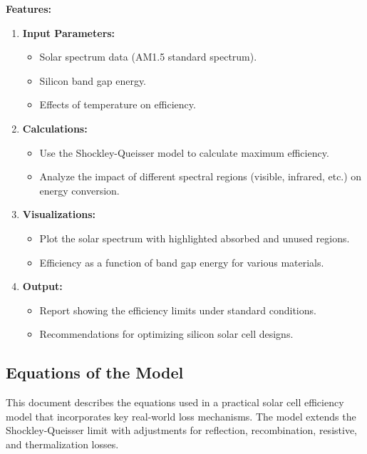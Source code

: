 \documentclass[11pt]{article}
\begin{document}
\textbf{Features:}
\begin{enumerate}
    \item \textbf{Input Parameters:}
    \begin{itemize}
        \item Solar spectrum data (AM1.5 standard spectrum).
        \item Silicon band gap energy.
        \item Effects of temperature on efficiency.
    \end{itemize}
    \item \textbf{Calculations:}
    \begin{itemize}
        \item Use the Shockley-Queisser model to calculate maximum efficiency.
        \item Analyze the impact of different spectral regions (visible, infrared, etc.) on energy conversion.
    \end{itemize}
    \item \textbf{Visualizations:}
    \begin{itemize}
        \item Plot the solar spectrum with highlighted absorbed and unused regions.
        \item Efficiency as a function of band gap energy for various materials.
    \end{itemize}
    \item \textbf{Output:}
    \begin{itemize}
        \item Report showing the efficiency limits under standard conditions.
        \item Recommendations for optimizing silicon solar cell designs.
    \end{itemize}
\end{enumerate}

\newpage
\subsection{Equations of the Model}

This document describes the equations used in a practical solar cell efficiency model that incorporates key real-world loss mechanisms. The model extends the Shockley-Queisser limit with adjustments for reflection, recombination, resistive, and thermalization losses.
\end{document}
